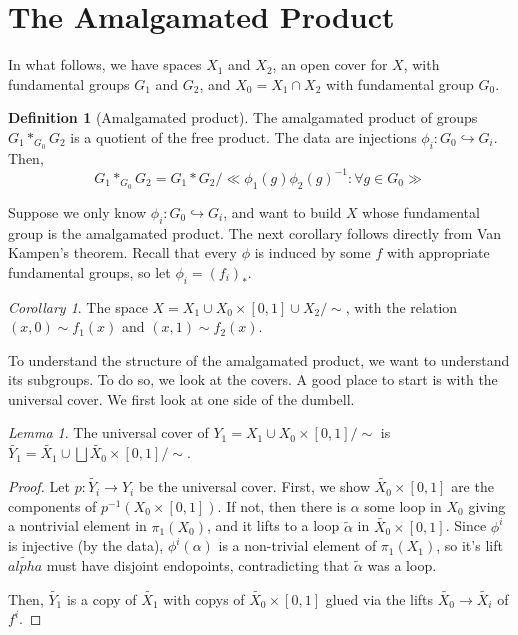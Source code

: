 \documentclass[11pt]{article}
\theoremstyle{definition}
\newtheorem{definition}{Definition}[section]
\theoremstyle{example}
\theoremstyle{remark}
\theoremstyle{lemma}
\newtheorem{lemma}{Lemma}[section]
\theoremstyle{proposition}
\theoremstyle{Problem}
\theoremstyle{Solution}
\theoremstyle{theorem}
\theoremstyle{corollary}
\newtheorem{corollary}{Corollary}[section]
\begin{document}
\section{The Amalgamated Product}
In what follows, we have spaces $X_1$ and $X_2$, an open cover for $X$, with fundamental groups $G_1$ and $G_2$, and $X_0 = X_1\cap X_2$ with fundamental group $G_0$.

\begin{definition}[Amalgamated product]
The amalgamated product of groups $G_1 \ast_{G_0} G_2$ is a quotient of the free product.
The data are injections $\phi_i : G_0 \hookrightarrow G_i$. Then,
$$G_1 \ast_{G_0} G_2 = G_1 * G_2 / \ll \phi_1(g)\phi_2(g)^{-1} : \forall g \in G_0\gg$$
\end{definition}
Suppose we only know $\phi_i : G_0 \hookrightarrow G_i$, and want to build $X$ whose fundamental group is the amalgamated product. The next corollary follows directly from Van Kampen's theorem. Recall that every $\phi$ is induced by some $f$ with appropriate fundamental groups, so let $\phi_i = (f_i)_*$.
\begin{corollary}
The space $X = X_1\cup X_0 \times [0,1] \cup X_2/\sim$, with the relation $(x,0) \sim f_1(x)$ and $(x,1) \sim f_2(x)$. 
\end{corollary}
To understand the structure of the amalgamated product, we want to understand its subgroups. To do so, we look at the covers. A good place to start is with the universal cover. We first look at one side of the dumbell.
\begin{lemma}
The universal cover of $Y_1=X_1\cup X_0\times[0,1]/\sim$ is $\widetilde{Y_1} = \widetilde{X_1} \cup \bigsqcup\widetilde{X_0}\times [0,1]/\sim$.
\end{lemma}
\begin{proof}
Let $p:\widetilde{Y_i}\to Y_i$ be the universal cover. First, we show $\widetilde{X_0}\times [0,1]$ are the components of $p^{-1}(X_0\times[0,1])$. If not, then there is $\alpha$ some loop in $X_0$ giving a nontrivial element in $\pi_1(X_0)$, and it lifts to a loop $\tilde{\alpha}$ in $\widetilde{X_0}\times [0,1]$. Since $\phi^i$ is injective (by the data), $\phi^i(\alpha)$ is a non-trivial element of $\pi_1(X_1)$, so it's lift $\tilde{alpha}$ must have disjoint endopoints, contradicting that $\tilde{\alpha}$ was a loop.

Then, $\widetilde{Y_1}$ is a copy of $\widetilde{X_1}$ with copys of $\widetilde{X_0}\times [0,1]$ glued via the lifts $\widetilde{X_0}\to\widetilde{X_i}$ of $f^i$.
\end{proof}
	
\end{document}
